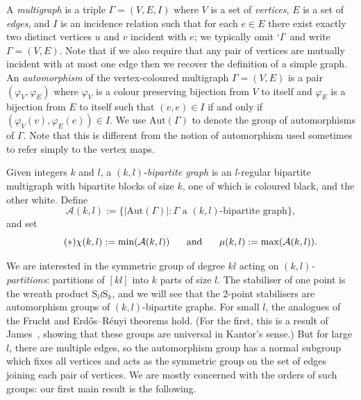 \documentclass{daj}
\renewcommand\S{\mathrm{S}}
\newcommand\Aut{\mathrm{Aut}}
\theoremstyle{plain}
\theoremstyle{definition}
\begin{document}
A \emph{multigraph} is a triple $\Gamma=(V,E,I)$ where $V$ is a set of \emph{vertices}, $E$ is a set of \emph{edges}, and $I$ is an incidence relation such that for each $e\in E$ there exist exactly two distinct vertices $u$ and $v$ incident with $e$; we typically omit `$I$' and write $\Gamma=(V,E)$. Note that if we also require that any pair of vertices are mutually incident with at most one edge then we recover the definition of a simple graph. An \emph{automorphism} of the vertex-coloured multigraph $\Gamma=(V,E)$ is a pair $(\varphi_V,\varphi_E)$ where $\varphi_V$ is a colour preserving bijection from $V$ to itself and $\varphi_E$ is a bijection from $E$ to itself such that $(v,e)\in I$ if and only if $(\varphi_V(v),\varphi_E(e))\in I$. We use $\Aut(\Gamma)$ to denote the group of automorphisms of $\Gamma$. Note that this is different from the notion of automorphism used sometimes to refer simply to the vertex maps.

Given integers $k$ and $l$, a $(k,l)$-\emph{bipartite graph} is an $l$-regular bipartite multigraph with bipartite blocks of size $k$, one of which is coloured black, and the other white. Define $$\mathcal{A}(k,l):=\{|\Aut(\Gamma)| : \Gamma \text{ a $(k,l)$-bipartite graph}\},$$ and set \begin{equation}\label{chi}\tag{$*$}\chi(k,l):=\min(\mathcal{A}(k,l))\hspace{.5cm}\text{ and }\hspace{.5cm}\mu(k,l):=\max(\mathcal{A}(k,l)).\end{equation} 

We are interested in the symmetric
group of degree $kl$ acting on \emph{$(k,l)$-partitions}: partitions of $[kl]$ into $k$ parts of size $l$. The stabiliser of one point is the wreath product
$\S_l\wr \S_k$, and we will see that the 2-point stabilisers are automorphism
groups of $(k,l)$-bipartite graphs. For small $l$, the analogues of the Frucht and
Erd\H{o}s--R\'enyi theorems hold. (For the first, this is a result of
James~\cite{james2}, showing that these groups are universal in Kantor's sense.) But for
large $l$, there are multiple edges, so the automorphism group has a normal
subgroup which fixes all vertices and acts as the symmetric group on the set
of edges joining each pair of vertices. We are mostly concerned with the orders of such groups: our first main result is the following.
\end{document}
